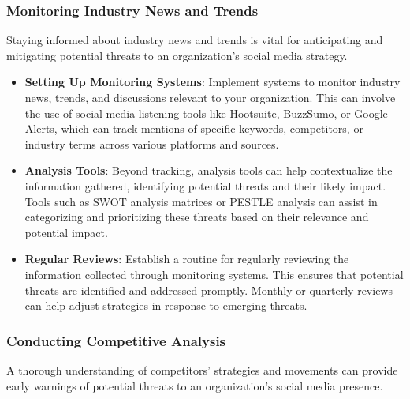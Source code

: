 \documentclass[
]{book}
\providecommand{\tightlist}{%
  \setlength{\itemsep}{0pt}\setlength{\parskip}{0pt}}
\begin{document}
\hypertarget{monitoring-industry-news-and-trends}{%
\subsubsection*{Monitoring Industry News and Trends}\label{monitoring-industry-news-and-trends}}

Staying informed about industry news and trends is vital for anticipating and mitigating potential threats to an organization's social media strategy.

\begin{itemize}
\tightlist
\item
  \textbf{Setting Up Monitoring Systems}: Implement systems to monitor industry news, trends, and discussions relevant to your organization. This can involve the use of social media listening tools like Hootsuite, BuzzSumo, or Google Alerts, which can track mentions of specific keywords, competitors, or industry terms across various platforms and sources.
\item
  \textbf{Analysis Tools}: Beyond tracking, analysis tools can help contextualize the information gathered, identifying potential threats and their likely impact. Tools such as SWOT analysis matrices or PESTLE analysis can assist in categorizing and prioritizing these threats based on their relevance and potential impact.
\item
  \textbf{Regular Reviews}: Establish a routine for regularly reviewing the information collected through monitoring systems. This ensures that potential threats are identified and addressed promptly. Monthly or quarterly reviews can help adjust strategies in response to emerging threats.
\end{itemize}

\hypertarget{conducting-competitive-analysis}{%
\subsubsection*{Conducting Competitive Analysis}\label{conducting-competitive-analysis}}

A thorough understanding of competitors' strategies and movements can provide early warnings of potential threats to an organization's social media presence.
\end{document}
